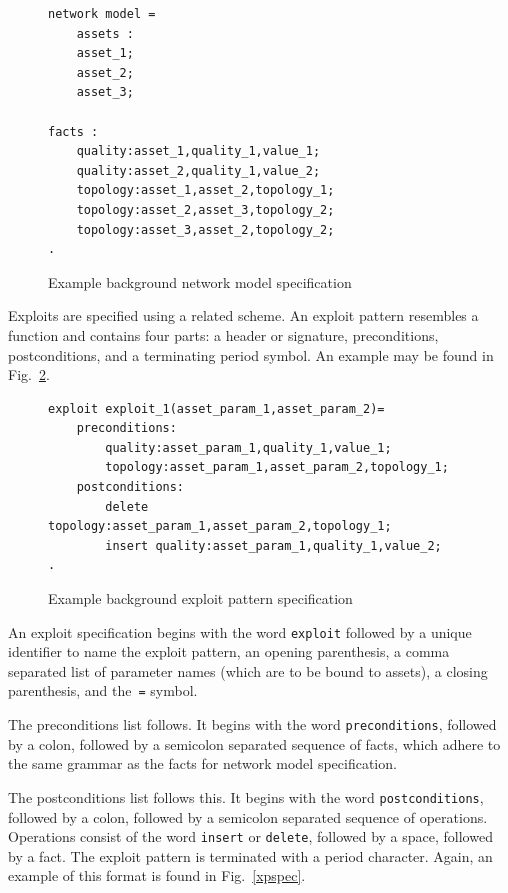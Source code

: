 \begin{figure}
\begin{lstlisting}
network model = 
    assets :
    asset_1;
    asset_2;
    asset_3;

facts :
	quality:asset_1,quality_1,value_1;
	quality:asset_2,quality_1,value_2;
	topology:asset_1,asset_2,topology_1;
	topology:asset_2,asset_3,topology_2;
    topology:asset_3,asset_2,topology_2;
.
\end{lstlisting}
\label{fig:nmspec}
\caption{Example background network model specification}
\end{figure}
Exploits are specified using a related scheme. An exploit pattern resembles a function
and contains four parts: a header or signature, preconditions, postconditions, and a
terminating period symbol. An example may be found in Fig.~\ref{fig:xpspec}.

\begin{figure}
\begin{lstlisting}
exploit exploit_1(asset_param_1,asset_param_2)=
    preconditions:
        quality:asset_param_1,quality_1,value_1;
        topology:asset_param_1,asset_param_2,topology_1;
    postconditions:
        delete topology:asset_param_1,asset_param_2,topology_1;
        insert quality:asset_param_1,quality_1,value_2;
.
\end{lstlisting}
\label{fig:xpspec}
\caption{Example background exploit pattern specification}
\end{figure}

An exploit specification begins with the word \texttt{exploit} followed by a
unique identifier to name the exploit pattern, an opening parenthesis, a comma separated
list of parameter names (which are to be bound to assets), a closing parenthesis, and 
the~\texttt{=} symbol.

The preconditions list follows. It begins with the word \texttt{preconditions}, followed
by a colon, followed by a semicolon separated sequence of facts, which adhere to the
same grammar as the facts for network model specification. 

The postconditions list follows this. It begins with the word \texttt{postconditions},
followed by a colon, followed by a semicolon separated sequence of operations. Operations
consist of the word \texttt{insert} or \texttt{delete}, followed by a space, followed by
a fact. The exploit pattern is terminated with a period character. Again, an
example of this format is found in Fig.~\ref{xpspec}.

